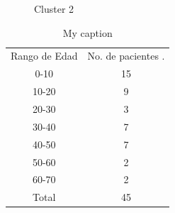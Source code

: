 \begin{figure}[H]
	\centering
	\caption{Cluster 2} \label{fig:c2}
\end{figure}

\begin{table}[]
	\centering
	\caption{My caption}
	\label{my-label}
	\begin{tabular}{@{}|c|c|@{}}
		Rango de Edad & No. de pacientes . \\ 
		0-10          & 15                 \\
		10-20         & 9                  \\
		20-30         & 3                  \\
		30-40         & 7                  \\
		40-50         & 7                  \\
		50-60         & 2                  \\ 
		60-70         & 2                  \\
		Total         & 45                 \\
	\end{tabular}
\end{table}

